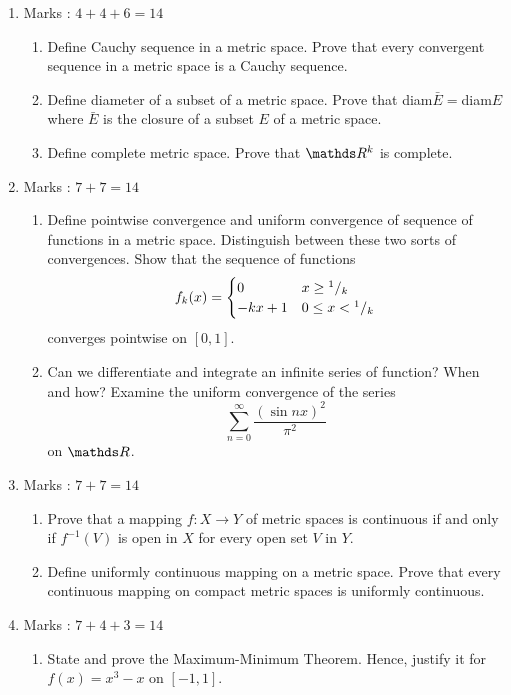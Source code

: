 \documentclass[../main-sheet.tex]{subfiles}
\begin{document}
\begin{enumerate}
        \item Marks : $ 4+4+6=14 $
          \begin{enumerate}
            \item Define Cauchy sequence in a metric space. Prove that every convergent sequence in a metric space is a Cauchy sequence.
              \item Define diameter of a subset of a metric space. Prove that diam$ \bar{E}= $diam$ E $ where $ \bar{E} $ is the closure of a subset $ E $ of a metric space.
              \item Define complete metric space. Prove that $ \R^k $ is complete.
            \end{enumerate}
    \item Marks : $ 7+7=14 $
    \begin{enumerate}
              \item Define pointwise convergence and uniform convergence of sequence of functions in a metric space. Distinguish between these two sorts of convergences. Show that the sequence of functions
              \[
                  f_k(x)=\begin{cases}
                  0 & x\geq {}^{1}/{}_{k}\\
                  -kx+1 & 0\leq x < {}^{1}/{}_{k}
                \end{cases}
              \] 
              converges pointwise on $ [0, 1] $.
              \item Can we differentiate and integrate an infinite series of function? When and how? Examine the uniform convergence of the series
              \[
                  \sum_{n=0}^\infty \frac{(\sin nx)^2}{\pi^2}
                  \]
                  on $ \R $.
        \end{enumerate}
        \item Marks : $ 7+7=14 $
        \begin{enumerate}
              \item Prove that a mapping $ f: X \to Y $ of metric spaces is continuous if and only if $ f^{-1}(V) $ is open in $ X $ for every open set $ V $ in $ Y $.
              \item Define uniformly continuous mapping on a metric space. Prove that every continuous mapping on compact metric spaces is uniformly continuous.
            \end{enumerate}
    \item Marks : $ 7+4+3=14 $
    \begin{enumerate}
        \item State and prove the Maximum-Minimum Theorem. Hence, justify it for $ f(x) = x^3 - x $ on $ [-1, 1] $.

\end{enumerate}
\end{enumerate}
\end{document}
